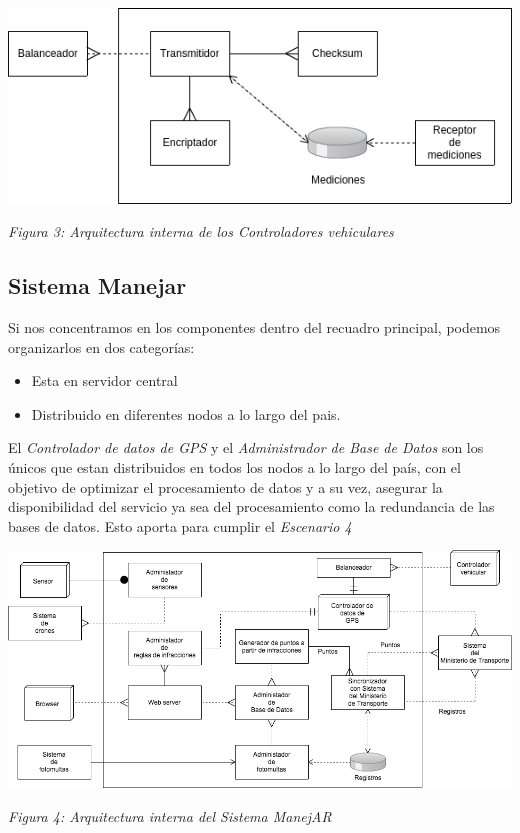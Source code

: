 \begin{center}
  \includegraphics[width=1\textwidth]{./imagenes/arquitectura_tp2/controlador_vehicular.png}
  \centerline{\textit{Figura 3: Arquitectura interna de los Controladores vehiculares}}
\end{center}

\newpage

\subsection{Sistema Manejar}

Si nos concentramos en los componentes dentro del recuadro principal, podemos 
organizarlos en dos categorías:

\begin{itemize}
  \item Esta en servidor central
  \item Distribuido en diferentes nodos a lo largo del pais.  
\end{itemize}


El \textit{Controlador de datos de GPS} y el \textit{Administrador de Base de Datos} 
son los únicos que estan distribuidos en todos los nodos a lo largo del país, 
con el objetivo de optimizar el procesamiento de datos y a su vez, asegurar la 
disponibilidad del servicio ya sea del procesamiento como la redundancia de las bases de datos.
Esto aporta para cumplir el \textit{Escenario 4}

\begin{center}
  \includegraphics[width=1\textwidth]{./imagenes/arquitectura_tp2/manejar.png}
  \centerline{\textit{Figura 4: Arquitectura interna del Sistema ManejAR}}
\end{center}

